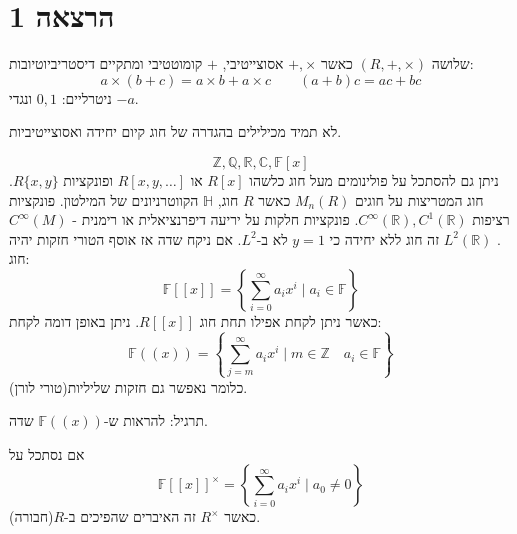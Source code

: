 \documentclass{tstextbook}
\begin{document}
\section{הרצאה 1}

\begin{definition}[חוג]
שלושה \((R,+,\times)\) כאשר \(+,\times\) אסוצייטיבי, \(+\) קומוטטיבי ומתקיים דיסטריביוטיובות:
$$a\times(b+c)=a\times b+a\times c \qquad (a+b)c=ac+bc$$
ניטרליים: \(0,1\) ונגדי \(-a\).

\end{definition}
\begin{remark}
לא תמיד מכילילים בהגדרה של חוג קיום יחידה ואסוצייטיביות.

\end{remark}
\begin{example}
$$\mathbb{Z},\mathbb{Q} ,\mathbb{R},\mathbb{C}, \mathbb{F} [x]$$
ניתן גם להסתכל על פולינומים מעל חוג כלשהו \(R[x]\) או \(R[x,y, \dots]\) ופונקציות \(R\{ x,y \}\). חוג המטריצות על חוגים \(M_{n}(R)\) כאשר \(R\) חוג, \(\mathbb{H}\) הקווטרניונים של המילטון. פונקציות רציפות \(C^{\infty}(\mathbb{R}),C^{1}(\mathbb{R})\). פונקציות חלקות על יריעה דיפרנציאלית או רימנית - \(C^{\infty}(M)\). \(L^{2}(\mathbb{R})\) זה חוג ללא יחידה כי \(y=1\) לא ב-\(L^{2}\).
אם ניקח שדה אז אוסף הטורי חזקות יהיה חוג:
$$\mathbb{F} [[x]]=\left\{  \sum_{i=0}^{\infty} a_{i}x^{i}\mid a_{i} \in \mathbb{F}  \right\}$$
כאשר ניתן לקחת אפילו תחת חוג \(R[[x]]\). ניתן באופן דומה לקחת:
$$\mathbb{F} ((x))=\left\{  \sum_{j=m}^{\infty} a_{i}x^{i} \mid m \in \mathbb{Z}\quad a_{i}\in \mathbb{F}   \right\}$$
כלומר נאפשר גם חזקות שליליות(טורי לורן).

\end{example}
תרגיל:
להראות ש-\(\mathbb{F}((x))\) שדה. 

אם נסתכל על 
$$\mathbb{F}[[x]]^{\times}=\left\{  \sum_{i=0}^{\infty} a_{i}x^{i}\mid a_{0}\neq 0 \right\}$$
כאשר \(R^{\times}\) זה האיברים שהפיכים ב-\(R\)(חבורה).
\end{document}
